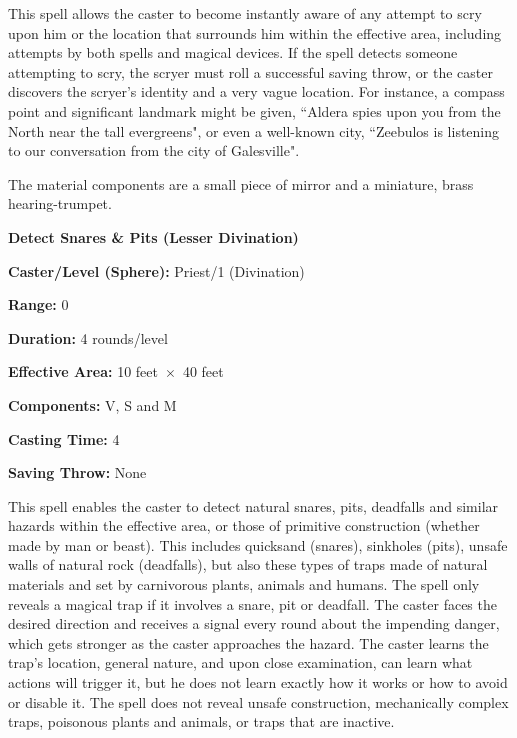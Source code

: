 \begin{multicols}{2}
\begin{minipage}{\columnwidth}
\end{minipage}

This spell allows the caster to become instantly aware of any attempt to scry upon him or the location that surrounds him within the effective area, including attempts by both spells and magical devices.  If the spell detects someone attempting to scry, the scryer must roll a successful saving throw, or the caster discovers the scryer's identity and a very vague location.  For instance, a compass point and significant landmark might be given, ``Aldera spies upon you from the North near the tall evergreens", or even a well-known city, ``Zeebulos is listening to our conversation from the city of Galesville". 

The material components are a small piece of mirror and a miniature, brass hearing-trumpet.

\vspace{1em}

\noindent
\begin{minipage}{\columnwidth}

\noindent \textbf{Detect Snares \& Pits (Lesser Divination)}

\noindent \textbf{Caster/Level (Sphere):} Priest/1 (Divination)

\noindent \textbf{Range:} 0

\noindent \textbf{Duration:} 4 rounds/level

\noindent \textbf{Effective Area:} 10 feet~$\times$~40 feet

\noindent \textbf{Components:} V, S and M

\noindent \textbf{Casting Time:} 4

\noindent \textbf{Saving Throw:} None

\end{minipage}

This spell enables the caster to detect natural snares, pits, deadfalls and similar hazards within the effective area, or those of primitive construction (whether made by man or beast).  This includes quicksand (snares), sinkholes (pits), unsafe walls of natural rock (deadfalls), but also these types of traps made of natural materials and set by carnivorous plants, animals and humans.  The spell only reveals a magical trap if it involves a snare, pit or deadfall.  The caster faces the desired direction and receives a signal every round about the impending danger, which gets stronger as the caster approaches the hazard.  The caster learns the trap's location, general nature, and upon close examination, can learn what actions will trigger it, but he does not learn exactly how it works or how to avoid or disable it.  The spell does not reveal unsafe construction, mechanically complex traps, poisonous plants and animals, or traps that are inactive.


\end{multicols}
